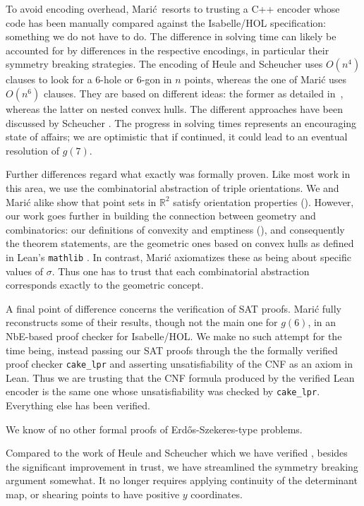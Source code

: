 To avoid encoding overhead,
Marić resorts to trusting a C++ encoder
whose code has been manually compared against the Isabelle/HOL specification:
something we do not have to do.
The difference in solving time
can likely be accounted for by differences in the respective encodings,
in particular their symmetry breaking strategies.
The encoding of Heule and Scheucher uses $O(n^4)$ clauses
to look for a $6$-hole or $6$-gon in $n$ points,
whereas the one of Marić uses $O(n^6)$ clauses.
They are based on different ideas:
the former as detailed in~,
whereas the latter on nested convex hulls.
The different approaches have been discussed by Scheucher \cite{scheucherTwoDisjoint5holes2020}.
The progress in solving times
represents an encouraging state of affairs;
we are optimistic that if continued,
it could lead to an eventual resolution of $g(7)$.

Further differences regard what exactly was formally proven.
Like most work in this area,
we use the combinatorial abstraction of triple orientations.
We and Marić alike show that point sets in $\mathbb R^2$
satisfy orientation properties ().
However, our work goes further in building the connection
between geometry and combinatorics:
our definitions of convexity and emptiness (),
and consequently the theorem statements,
are the geometric ones based on convex hulls
as defined in Lean's \texttt{mathlib} \cite{The_mathlib_Community_2020}.
In contrast, Marić axiomatizes these as being about specific values of $\sigma$.
Thus one has to trust that each combinatorial abstraction
corresponds exactly to the geometric concept.

A final point of difference concerns the verification of SAT proofs.
Marić fully reconstructs some of their results,
though not the main one for $g(6)$,
in an NbE-based proof checker for Isabelle/HOL.
We make no such attempt for the time being,
instead passing our SAT proofs through the the formally verified proof checker \texttt{cake\_lpr} \cite{tanVerifiedPropagationRedundancy2023}
and asserting unsatisfiability of the CNF as an axiom in Lean.
Thus we are trusting that the CNF formula produced by the verified Lean encoder
is the same one whose unsatisfiability was checked by \texttt{cake\_lpr}.
Everything else has been verified.

We know of no other formal proofs of Erd\H{o}s-Szekeres-type problems.

Compared to the work of Heule and Scheucher which we have verified \cite{emptyHexagonNumber},
besides the significant improvement in trust,
we have streamlined the symmetry breaking argument somewhat.
It no longer requires applying continuity of the determinant map,
or shearing points to have positive $y$ coordinates.

